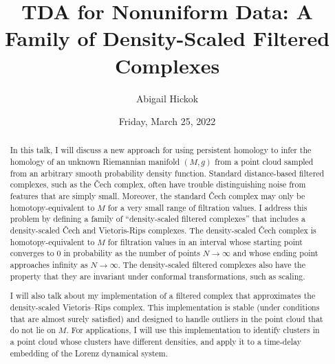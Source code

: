 \documentclass{UAmathtalk}
\author{Abigail Hickok}
\title{TDA for Nonuniform Data: A Family of Density-Scaled Filtered Complexes}
\date{Friday, March 25, 2022}
\begin{document}
\maketitle

\begin{abstract}
In this talk, I will discuss a new approach for using persistent homology to infer the homology of an unknown Riemannian manifold $(M, g)$ from a point cloud sampled from an arbitrary smooth probability density function. 
Standard distance-based filtered complexes, such as the \v{C}ech complex, often have trouble distinguishing noise from features that are simply small. 
Moreover, the standard \v{C}ech complex may only be homotopy-equivalent to $M$ for a very small range of filtration values. 
I address this problem by defining a family of ``density-scaled filtered complexes'' that includes a density-scaled \v{C}ech and Vietoris-Rips complexes. 
The density-scaled \v{C}ech complex is homotopy-equivalent to $M$ for filtration values in an interval whose starting point converges to 0 in probability as the number of points $N \to \infty$ and whose ending point approaches infinity as $N \to \infty$. 
The density-scaled filtered complexes also have the property that they are invariant under conformal transformations, such as scaling. 

I will also talk about my implementation of a filtered complex that approximates the density-scaled Vietoris--Rips complex. 
This implementation is stable (under conditions that are almost surely satisfied) and designed to handle outliers in the point cloud that do not lie on $M$. 
For applications, I will use this implementation to identify clusters in a point cloud whose clusters have different densities, and apply it to a time-delay embedding of the Lorenz dynamical system.
\end{abstract}
\end{document}
